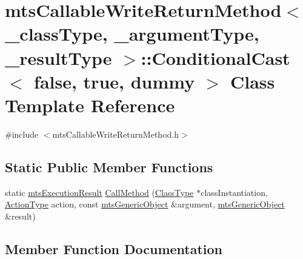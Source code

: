 \hypertarget{classmts_callable_write_return_method_1_1_conditional_cast_3_01false_00_01true_00_01dummy_01_4}{}\section{mts\+Callable\+Write\+Return\+Method$<$ \+\_\+class\+Type, \+\_\+argument\+Type, \+\_\+result\+Type $>$\+:\+:Conditional\+Cast$<$ false, true, dummy $>$ Class Template Reference}
\label{classmts_callable_write_return_method_1_1_conditional_cast_3_01false_00_01true_00_01dummy_01_4}


{\ttfamily \#include $<$mts\+Callable\+Write\+Return\+Method.\+h$>$}

\subsection*{Static Public Member Functions}
\begin{DoxyCompactItemize}
\item 
static \hyperlink{classmts_execution_result}{mts\+Execution\+Result} \hyperlink{classmts_callable_write_return_method_1_1_conditional_cast_3_01false_00_01true_00_01dummy_01_4_ab6c7ca9fca21849c6aa63073ac0d1743}{Call\+Method} (\hyperlink{classmts_callable_write_return_method_a51dbe6298941ab172d83182c8188092d}{Class\+Type} $\ast$class\+Instantiation, \hyperlink{classmts_callable_write_return_method_a650562eae4db20a5cfbbff0f9f7e1a0a}{Action\+Type} action, const \hyperlink{classmts_generic_object}{mts\+Generic\+Object} \&argument, \hyperlink{classmts_generic_object}{mts\+Generic\+Object} \&result)
\end{DoxyCompactItemize}


\subsection{Member Function Documentation}
\hypertarget{classmts_callable_write_return_method_1_1_conditional_cast_3_01false_00_01true_00_01dummy_01_4_ab6c7ca9fca21849c6aa63073ac0d1743}{}
